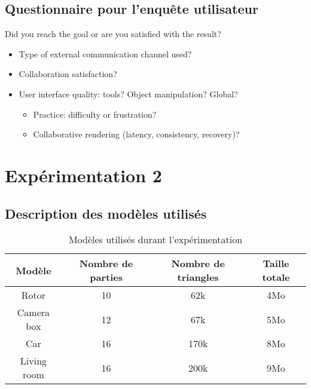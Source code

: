 \subsection{Questionnaire pour l'enquête utilisateur}
\label{q:xp1}
Did you reach the goal or are you satisfied with the result?
\begin{itemize}
	\item Type of external communication channel used?
	\item Collaboration satisfaction?
	\item User interface quality: tools? Object manipulation? Global?
	\begin{itemize}
		\item Practice: difficulty or frustration?
		\item Collaborative rendering (latency, consistency, recovery)?
	\end{itemize}
\end{itemize}
\section{Expérimentation 2}
\label{app:quest}
\subsection{Description des modèles utilisés}
\begin{table}[ht]
	\centering
	\caption{Modèles utilisés durant l'expérimentation}
	\label{table:models_xp2}
	\begin{tabular}{cccc}\hline
		\textbf{Modèle}  & \textbf{Nombre de parties} &  \textbf{Nombre de triangles} 
		& \textbf{Taille totale}  \\ \hline
		Rotor      &   10  &    62k & 4Mo        \\
		Camera box        &   12  &    67k & 5Mo        \\
		Car      &   16  &      170k & 8Mo \\ 
		Living room      &   16  &      200k & 9Mo \\    \bottomrule
	\end{tabular}
\end{table}
